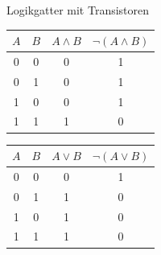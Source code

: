\begin{bonus}{Logikgatter mit Transistoren}
\begin{center}
        \begin{minipage}[t]{0.33\textwidth}
            \begin{center}
                \begin{tabular}{|c|c||c|c|}
                    \hline
                    $A$ & $B$ & $A \land B$ & $\lnot (A \land B)$ \\\hline\hline
                    0   & 0   & 0           & 1                   \\\hline
                    0   & 1   & 0           & 1                   \\\hline
                    1   & 0   & 0           & 1                   \\\hline
                    1   & 1   & 1           & 0                   \\\hline
                \end{tabular}
            \end{center}
        \end{minipage}
        \begin{minipage}[t]{0.33\textwidth}
            \begin{center}
                \begin{tabular}{|c|c||c|c|}
                    \hline
                    $A$ & $B$ & $A \lor B$ & $\lnot (A \lor B)$ \\\hline\hline
                    0   & 0   & 0          & 1                  \\\hline
                    0   & 1   & 1          & 0                  \\\hline
                    1   & 0   & 1          & 0                  \\\hline
                    1   & 1   & 1          & 0                  \\\hline
                \end{tabular}
            \end{center}
        \end{minipage}
    \end{center}
\end{bonus}

